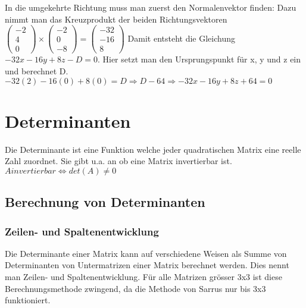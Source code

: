 \documentclass[11pt,a4paper,onecolumn]{scrartcl}
\begin{document}
\begin{flushleft}
\newline
In die umgekehrte Richtung muss man zuerst den Normalenvektor finden: \linebreak
Dazu nimmt man das Kreuzprodukt der beiden Richtungsvektoren \linebreak
$(\begin{smallmatrix} -2 \\ 4 \\ 0 \end{smallmatrix}) \times (\begin{smallmatrix} -2 \\ 0 \\ -8 \end{smallmatrix}) = (\begin{smallmatrix} -32 \\ -16 \\ 8 \end{smallmatrix})$ \linebreak
Damit entsteht die Gleichung $-32x - 16y + 8z - D = 0$. Hier setzt man den Ursprungspunkt für x, y und z ein und berechnet D. \linebreak
$-32(2) - 16(0) + 8 (0) = D \Rightarrow D -64 \Rightarrow -32x - 16y + 8z  + 64 = 0$


\section{Determinanten}
Die Determinante ist eine Funktion welche jeder quadratischen Matrix eine reelle Zahl zuordnet. Sie gibt u.a. an ob eine Matrix invertierbar ist.\linebreak
$ A invertierbar \Leftrightarrow det(A) \neq 0 $ \linebreak

\subsection{Berechnung von Determinanten}

\subsubsection{Zeilen- und Spaltenentwicklung}
Die Determinante einer Matrix kann auf verschiedene Weisen als Summe von Determinanten von Untermatrizen einer Matrix berechnet werden. Dies nennt man Zeilen- und Spaltenentwicklung. Für alle Matrizen grösser 3x3 ist diese Berechnungsmethode zwingend, da die Methode von Sarrus nur bis 3x3 funktioniert.\linebreak


\end{flushleft}
\end{document}
